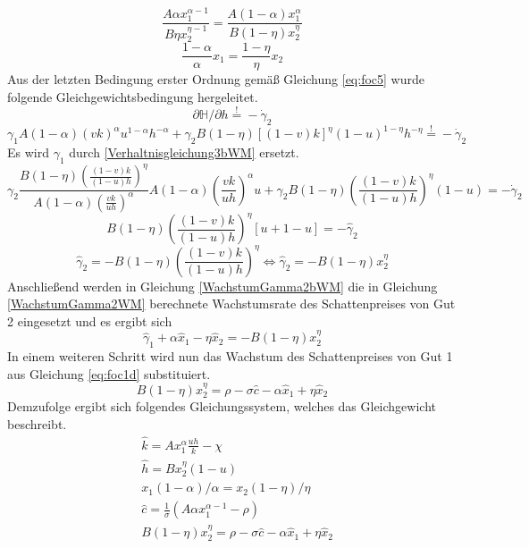 \begin{equation}
\frac{A\alpha x_1^{\alpha-1}}{B\eta x_2^{\eta-1}}=\frac{A(1-\alpha)x_1^{\alpha}}{B(1-\eta)x_2^\eta}
\end{equation}
\begin{equation}
\boxed{\frac{1-\alpha}{\alpha}x_1=\frac{1-\eta}{\eta}x_2}
\end{equation}
Aus der letzten Bedingung erster Ordnung gemä{\ss} Gleichung \eqref{eq:foc5} wurde folgende Gleichgewichtsbedingung hergeleitet.
\begin{equation*}
\partial\mathbb{H}/\partial h\overset{!}{=}-\dot{\gamma}_2
\end{equation*}
\begin{equation}
\gamma_1A(1-\alpha)(vk)^\alpha u^{1-\alpha}h^{-\alpha}+\gamma_2 B(1-\eta)[(1-v)k]^{\eta}(1-u)^{1-\eta}h^{-\eta}\overset{!}{=}-\dot{\gamma}_2
\end{equation}
Es wird $\gamma_1$ durch \eqref{Verhaltnisgleichung3bWM} ersetzt. 
\begin{equation*}
\gamma_2\frac{B(1-\eta)\left(\frac{(1-v)k}{(1-u)h}\right)^\eta}{A(1-\alpha)\left(\frac{vk}{uh}\right)^{\alpha}}A(1-\alpha)\left(\frac{vk}{uh}\right)^{\alpha}u+\gamma_2 B(1-\eta)\left(\frac{(1-v)k}{(1-u)h}\right)^\eta(1-u)=-\dot{\gamma}_2
\end{equation*}
\begin{equation*}
B(1-\eta)\left(\frac{(1-v)k}{(1-u)h}\right)^\eta[u+1-u]=-\hat{\gamma}_2
\end{equation*}
\begin{equation}
\hat{\gamma}_2=-B(1-\eta)\left(\frac{(1-v)k}{(1-u)h}\right)^\eta\Longleftrightarrow \hat{\gamma}_2=-B(1-\eta)x_2^\eta\label{WachstumGamma2bWM}
\end{equation}
Anschlie{\ss}end werden in Gleichung \eqref{WachstumGamma2bWM} die in Gleichung \eqref{WachstumGamma2WM} berechnete Wachstumsrate des Schattenpreises von Gut 2 eingesetzt und es ergibt sich 
\begin{equation}
\hat{\gamma}_{1}+\alpha\hat{x}_1-\eta\hat{x}_2 =-B
(1-\eta)x_2^\eta
\end{equation} 
In einem weiteren Schritt wird nun das Wachstum des Schattenpreises von Gut 1 aus Gleichung \eqref{eq:foc1d} substituiert. 
\begin{equation}
\boxed{B(1-\eta)x_2^\eta=\rho-\sigma\hat{c}-\alpha\hat{x}_1+\eta\hat{x}_2}
\end{equation}
Demzufolge ergibt sich folgendes Gleichungssystem, welches das Gleichgewicht beschreibt. 
\begin{align}
&\hat{k}=Ax_1^\alpha \frac{uh}{k}-\chi\label{GG1WM}\\
&\hat{h}=Bx_2^\eta(1-u)\label{GG2WM}\\
& x_1(1-\alpha)/\alpha =x_2(1-\eta)/\eta\label{GG3WM}\\
&\hat{c}=\frac{1}{\sigma}\left(A\alpha x_1^{\alpha -1}-\rho\right)\label{GG4WM}\\
&B(1-\eta)x_2^\eta=\rho-\sigma\hat{c}-\alpha\hat{x}_1+\eta\hat{x}_2\label{GG5WM}
\end{align}

